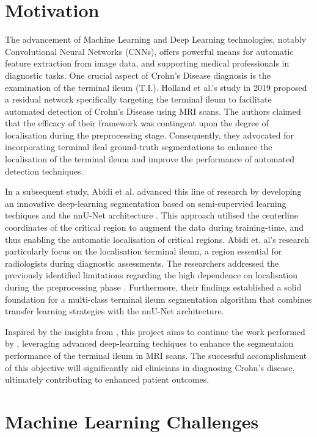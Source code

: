 \section{Motivation}

The advancement of Machine Learning and Deep Learning technologies, notably Convolutional Neural Networks (CNNs), offers powerful means for automatic feature extraction from image data, and supporting medical professionals in diagnostic tasks. One crucial aspect of Crohn's Disease diagnosis is the examination of the terminal ileum (T.I.). Holland et al.'s study \cite{holland2019automatic} in 2019 proposed a residual network specifically targeting the terminal ileum to facilitate automated detection of Crohn's Disease using MRI scans. The authors claimed that the efficacy of their framework was contingent upon the degree of localisation during the preprocessing stage. Consequently, they advocated for incorporating terminal ileal ground-truth segmentations to enhance the localisation of the terminal ileum and improve the performance of automated detection techniques.

In a subsequent study, Abidi et al. \cite{Ali2022} advanced this line of research by developing an innovative deep-learning segmentation based on semi-supervied learning techiques and the nnU-Net architecture \cite{isensee2021nnu}. This approach utilised the centerline coordinates of the critical region to augment the data during training-time, and thus enabling the automatic localisation of critical regions. Abidi et. al's research particularly focus on the localisation terminal ileum, a region essential for radiologists during diagnostic assessments. The researchers addressed the previously identified limitations regarding the high dependence on localisation during the preprocessing phase \cite{holland2019automatic}. Furthermore, their findings established a solid foundation for a multi-class terminal ileum segmentation algorithm that combines transfer learning strategies with the nnU-Net architecture.

Inspired by the insights from \cite{holland2019automatic, Ali2022}, this project aims to continue the work performed by \cite{Ali2022}, leveraging advanced deep-learning techiques to enhance the segmentaion performance of the terminal ileum in MRI scans. The successful accomplishment of this objective will significantly aid clinicians in diagnosing Crohn's disease, ultimately contributing to enhanced patient outcomes.

\section{Machine Learning Challenges}

